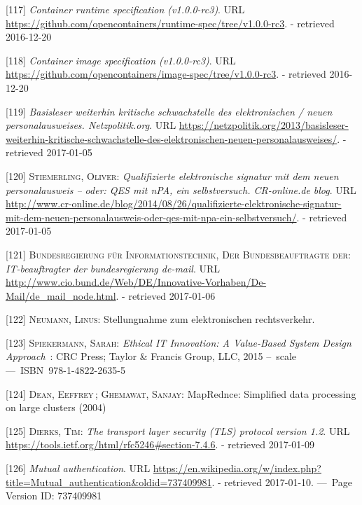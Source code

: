 \documentclass[12pt,english,a4paper,titlepage,cleardoublepage=empty,dottedtoc]{report}
\begin{document}
\hypertarget{ref-web_oci-spec_runtime}{}
{[}117{]} \emph{Container runtime specification (v1.0.0-rc3)}. URL
\url{https://github.com/opencontainers/runtime-spec/tree/v1.0.0-rc3}. -
retrieved 2016-12-20

\hypertarget{ref-web_oci-spec_image}{}
{[}118{]} \emph{Container image specification (v1.0.0-rc3)}. URL
\url{https://github.com/opencontainers/image-spec/tree/v1.0.0-rc3}. -
retrieved 2016-12-20

\hypertarget{ref-web_2013_npa-sicherheitsdefizit}{}
{[}119{]} \emph{Basisleser weiterhin kritische schwachstelle des
elektronischen / neuen personalausweises. Netzpolitik.org}. URL
\url{https://netzpolitik.org/2013/basisleser-weiterhin-kritische-schwachstelle-des-elektronischen-neuen-personalausweises/}.
- retrieved 2017-01-05

\hypertarget{ref-web_2014_test-qes-support-in-npa}{}
{[}120{]} \textsc{Stiemerling, Oliver}: \emph{Qualifizierte
elektronische signatur mit dem neuen personalausweis -- oder: QES mit
nPA, ein selbstversuch. CR-online.de blog}. URL
\url{http://www.cr-online.de/blog/2014/08/26/qualifizierte-elektronische-signatur-mit-dem-neuen-personalausweis-oder-qes-mit-npa-ein-selbstversuch/}.
- retrieved 2017-01-05

\hypertarget{ref-web_2017_about-de-mail}{}
{[}121{]} \textsc{Bundesregierung für Informationstechnik, Der
Bundesbeauftragte der}: \emph{IT-beauftragter der bundesregierung
de-mail}. URL
\url{http://www.cio.bund.de/Web/DE/Innovative-Vorhaben/De-Mail/de_mail_node.html}.
- retrieved 2017-01-06

\hypertarget{ref-statement_2013_de-mail}{}
{[}122{]} \textsc{Neumann, Linus}: Stellungnahme zum elektronischen
rechtsverkehr.

\hypertarget{ref-book_2015_ethical-it-innovation}{}
{[}123{]} \textsc{Spiekermann, Sarah}: \emph{Ethical IT Innovation: A
Value-Based System Design Approach}~: CRC Press; Taylor \& Francis
Group, LLC, 2015 --~scale ---~ISBN~978-1-4822-2635-5

\hypertarget{ref-paper_2004_distributed-mapreduce}{}
{[}124{]} \textsc{Dean, Eeffrey}\,; \textsc{Ghemawat, Sanjay}:
MapRednce: Simplified data processing on large clusters (2004)

\hypertarget{ref-web_spec_tls-12_client-auth}{}
{[}125{]} \textsc{Dierks, Tim}: \emph{The transport layer security (TLS)
protocol version 1.2}. URL
\url{https://tools.ietf.org/html/rfc5246\#section-7.4.6}. - retrieved
2017-01-09

\hypertarget{ref-web_2017_wikipedia_mutual-auth}{}
{[}126{]} \emph{Mutual authentication}. URL
\url{https://en.wikipedia.org/w/index.php?title=Mutual_authentication\&oldid=737409981}.
- retrieved 2017-01-10. ---~Page Version ID: 737409981
\end{document}
